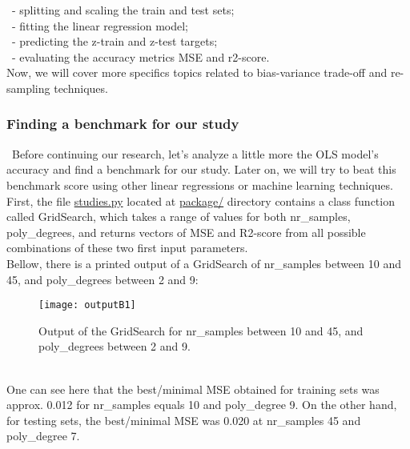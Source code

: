 \quad \, - splitting and scaling the train and test sets;\\

\quad \, - fitting the linear regression model;\\

\quad \, - predicting the z-train and z-test targets;\\

\quad \, - evaluating the accuracy metrics MSE and r2-score.\\

Now, we will cover more specifics topics related to bias-variance trade-off and re-sampling techniques.\\

\subsubsection{Finding a benchmark for our study}
\label{chap:Finding a benchmark for our study}

\quad \, Before continuing our research, let's analyze a little more the OLS model's accuracy and find a benchmark for our study. Later on, we will try to beat this benchmark score using other linear regressions or machine learning techniques.\\

First, the file \href{https://github.com/fabiorodp/UiO-FYS-STK4155/blob/master/Project1/package/studies.py}{studies.py} located at \href{https://github.com/fabiorodp/UiO-FYS-STK4155/tree/master/Project1/package}{package/} directory contains a class function called GridSearch, which takes a range of values for both nr\_samples, poly\_degrees, and returns vectors of MSE and R2-score from all possible combinations of these two first input parameters.\\

Bellow, there is a printed output of a GridSearch of nr\_samples between 10 and 45, and poly\_degrees between 2 and 9:\\

\begin{figure}[H]
\label{fig:outputB1}
\centering
\texttt{[image: outputB1]}
\caption{Output of the GridSearch for nr\_samples between 10 and 45, and poly\_degrees between 2 and 9.}
\end{figure}\\

One can see here that the best/minimal MSE obtained for training sets was approx. 0.012 for nr\_samples equals 10 and poly\_degree 9. On the other hand, for testing sets, the best/minimal MSE was 0.020 at nr\_samples 45 and poly\_degree 7.\\

